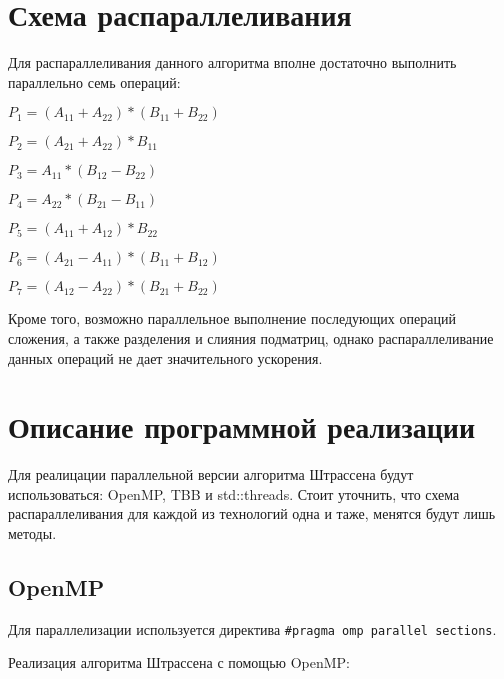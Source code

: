 \documentclass{article}
\begin{document}
\newpage

\section{Схема распараллеливания}
Для распараллеливания данного алгоритма вполне достаточно выполнить параллельно семь операций: 

\begin{center} 
$P_1=(A_{11}+A_{22})*(B_{11}+B_{22})$

$P_2=(A_{21}+A_{22})*B_{11}$

$P_3=A_{11}*(B_{12}-B_{22})$

$P_4=A_{22}*(B_{21}-B_{11})$

$P_5=(A_{11}+A_{12})*B_{22}$

$P_6=(A_{21}-A_{11})*(B_{11}+B_{12})$

$P_7=(A_{12}-A_{22})*(B_{21}+B_{22})$
\end{center}

\par Кроме того, возможно параллельное выполнение последующих операций сложения, а также разделения и слияния подматриц, однако распараллеливание данных операций не дает значительного ускорения.

\newpage

\section{Описание программной реализации}
Для реалицации параллельной версии алгоритма Штрассена будут использоваться: OpenMP, TBB и std::threads. Стоит уточнить, что схема распараллеливания для каждой из технологий одна и таже, менятся будут лишь методы.

\subsection{OpenMP}
Для параллелизации используется директива 
\verb|#pragma omp parallel sections|. 
\par Реализация алгоритма Штрассена с помощью OpenMP:
\end{document}

